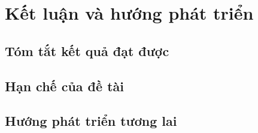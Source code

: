 \section{Kết luận và hướng phát triển}
\subsection{Tóm tắt kết quả đạt được}
\subsection{Hạn chế của đề tài}
\subsection{Hướng phát triển tương lai}